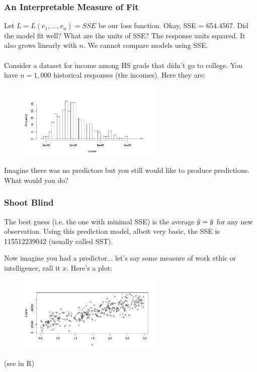 \documentclass[handout]{beamer}
\begin{document}
\begin{frame}\frametitle{An Interpretable Measure of Fit}

\small
Let $L = L(e_1, \ldots, e_n) = SSE$ be our loss function. Okay, SSE = 654.4567. Did the model fit well?   \pause What are the units of SSE?  \pause The response units squared.  \pause It also grows linearly with $n$. We cannot compare models using SSE.\\~\\

Consider a dataset for income among HS grads that didn't go to college. You have $n=1,000$ historical responses (the incomes). Here they are:

\vspace{-0.25cm}
\begin{figure}
\centering\includegraphics[width=2.7in]{incomes}
\end{figure}
 \pause 
	
\vspace{-0.25cm}
Imagine there was no predictors but you still would like to produce predictions. What would you do?
\end{frame}

\begin{frame}\frametitle{Shoot Blind}

The best guess (i.e. the one with minimal SSE) is the average $\hat{y} = \bar{y}$ for any new observation. Using this prediction model, albeit very basic, the SSE is 115512239042 (usually called SST). \pause 

Now imagine you had a predictor... let's say some measure of work ethic or intelligence, call it $x$. Here's a plot:

\vspace{-0.25cm}
\begin{figure}
\centering\includegraphics[width=2.7in]{income_by_x}
\end{figure}
	
(see in R)


\end{frame}
\end{document}
